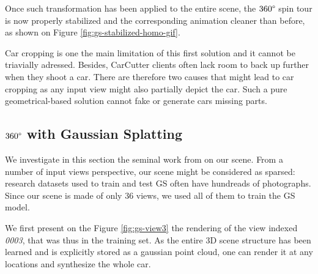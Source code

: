 Once such transformation has been applied to the entire scene, the $360\degree$ spin tour is now properly stabilized and the corresponding animation cleaner than before, as shown on Figure \ref{fig:gs-stabilized-homo-gif}. 

\begin{center}
  \label{fig:gs-stabilized-homo-gif}
\end{center}

Car cropping is one the main limitation of this first solution and it cannot be triavially adressed. Besides, CarCutter clients often lack room to back up further when they shoot a car. There are therefore two causes that might lead to car cropping as any input view might also partially depict the car. Such a pure geometrical-based solution cannot fake or generate cars missing parts. 

\subsection{$360\degree$ with Gaussian Splatting}

We investigate in this section the seminal work from \citep{kerbl20233d} on our scene. From a number of input views perspective, our scene might be considered as sparsed: research datasets used to train and test \ac{GS} often have hundreads of photographs. Since our scene is made of only 36 views, we used all of them to train the \ac{GS} model. 

We first present on the Figure \ref{fig:gs-view3} the rendering of the view indexed \textit{0003}, that was thus in the training set. As the entire 3D scene structure has been learned and is explicitly stored as a gaussian point cloud, one can render it at any locations and synthesize the whole car. 

